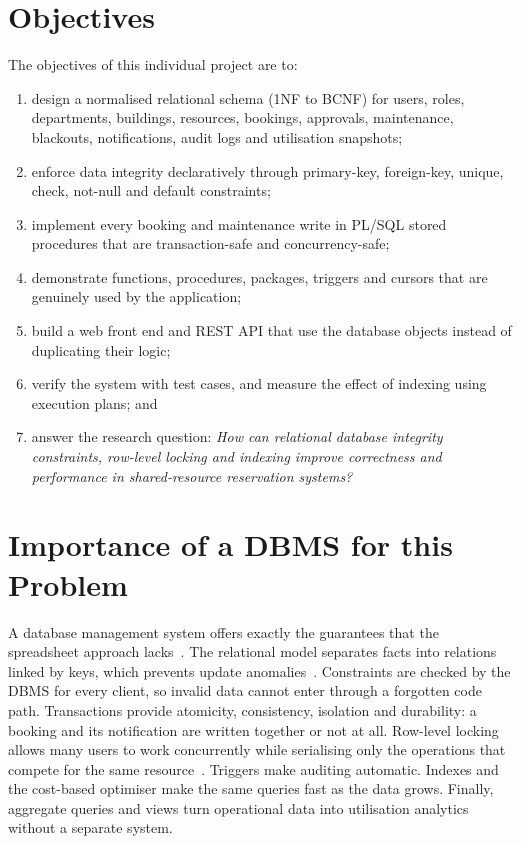 \documentclass[12pt,a4paper,oneside]{report}
\renewcommand{\_}{\origus\allowbreak}
\begin{document}
\section{Objectives}
The objectives of this individual project are to:
\begin{enumerate}
  \item design a normalised relational schema (1NF to BCNF) for users, roles, departments, buildings, resources, bookings, approvals, maintenance, blackouts, notifications, audit logs and utilisation snapshots;
  \item enforce data integrity declaratively through primary-key, foreign-key, unique, check, not-null and default constraints;
  \item implement every booking and maintenance write in PL/SQL stored procedures that are transaction-safe and concurrency-safe;
  \item demonstrate functions, procedures, packages, triggers and cursors that are genuinely used by the application;
  \item build a web front end and REST API that use the database objects instead of duplicating their logic;
  \item verify the system with test cases, and measure the effect of indexing using execution plans; and
  \item answer the research question: \emph{How can relational database integrity constraints, row-level locking and indexing improve correctness and performance in shared-resource reservation systems?}
\end{enumerate}

\section{Importance of a DBMS for this Problem}
A database management system offers exactly the guarantees that the spreadsheet approach lacks~\cite{elmasri,silberschatz}. The relational model separates facts into relations linked by keys, which prevents update anomalies~\cite{codd}. Constraints are checked by the DBMS for every client, so invalid data cannot enter through a forgotten code path. Transactions provide atomicity, consistency, isolation and durability: a booking and its notification are written together or not at all. Row-level locking allows many users to work concurrently while serialising only the operations that compete for the same resource~\cite{oracleLocking}. Triggers make auditing automatic. Indexes and the cost-based optimiser make the same queries fast as the data grows. Finally, aggregate queries and views turn operational data into utilisation analytics without a separate system.
\end{document}
